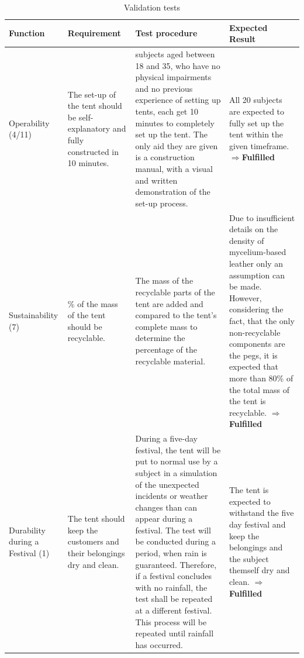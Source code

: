 \documentclass{article}
\begin{document}
\begin{table}[ht!]
    \caption{Validation tests}
    \label{tab:validation}
    \begin{tabularx}{\textwidth}{|>{\raggedright\arraybackslash}p{2.5cm}|>{\raggedright\arraybackslash}p{3.5cm}|>{\raggedright\arraybackslash}p{6cm}|>{\raggedright\arraybackslash}X|}
    \hline
    \rowcolor[gray]{0.75}
    \textbf{Function} & \textbf{Requirement} & \textbf{Test procedure} & \textbf{Expected Result} \\
    \hline
    Operability (4/11) & 
    The set-up of the tent should be self-explanatory and fully constructed in 10 minutes. & 
    20 subjects aged between 18 and 35, who have no physical impairments and no previous experience of setting up tents, each get 10 minutes to completely set up the tent. The only aid they are given is a construction manual, with a visual and written demonstration of the set-up process. &
    All 20 subjects are expected to fully set up the tent within the given timeframe. $\mathbf{\Rightarrow}$\textcolor{newgreen}{\textbf{Fulfilled}} \\
    \hline
    Sustainability (7) &
    80\% of the mass of the tent should be recyclable. &
    The mass of the recyclable parts of the tent are added and compared to the tent’s complete mass to determine the percentage of the recyclable material. &
    Due to insufficient details on the density of mycelium-based leather only an assumption can be made. However, considering the fact, that the only non-recyclable components are the pegs, it is expected that more than 80\% of the total mass of the tent is recyclable. $\mathbf{\Rightarrow}$\textcolor{newgreen}{\textbf{Fulfilled}} \\
    \hline
    Durability during a Festival (1) &
    The tent should keep the customers and their belongings dry and clean. &
    During a five-day festival, the tent will be put to normal use by a subject in a simulation of the unexpected incidents or weather changes than can appear during a festival. The test will be conducted during a period, when rain is guaranteed. Therefore, if a festival concludes with no rainfall, the test shall be repeated at a different festival. This process will be repeated until rainfall has occurred. &
    The tent is expected to withstand the five day festival and keep the belongings and the subject themself dry and clean. $\mathbf{\Rightarrow}$\textcolor{newgreen}{\textbf{Fulfilled}} \\
    \hline
    \end{tabularx}
\end{table}
\end{document}
